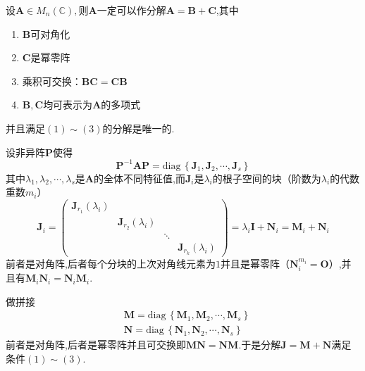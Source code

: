 \begin{formal}
\begin{theorem}\label{thm:Jordan-Chevalley分解定理}
    设$\bm{A}\in M_n\left(\mathbb{C}\right),$则$\bm{A}$一定可以作分解$\bm{A}=\bm{B}+\bm{C}$,其中\begin{enumerate}[label={\textup{(\arabic*)}}]
        \item $\bm{B}$可对角化
        \item $\bm{C}$是幂零阵
        \item 乘积可交换：$\bm{BC}=\bm{CB}$
        \item $\bm{B},\bm{C}$均可表示为$\bm{A}$的多项式
    \end{enumerate}并且满足$(1)\sim (3)$的分解是唯一的.
\end{theorem}
\begin{Proof}
    设非异阵$\bm{P}$使得\[
    \bm{P}^{-1}\bm{A}\bm{P}=\mathrm{diag}\,\left\{
        \bm{J}_1,\bm{J}_2,\cdots,\bm{J}_s
    \right\}
    \]其中$\lambda_1,\lambda_2,\cdots,\lambda_s$是$\bm{A}$的全体不同特征值,而$\bm{J}_i$是$\lambda_i$的根子空间的块（阶数为$\lambda_i$的代数重数$m_i$）\[
    \bm{J}_i=\begin{pmatrix}
        \bm{J}_{r_1}\left(\lambda_i\right)&&&\\
        &\bm{J}_{r_2}\left(\lambda_i\right)&&\\
        &&\ddots&\\
        &&&\bm{J}_{r_k}\left(\lambda_i\right)
    \end{pmatrix}=\lambda_i\bm{I}+\bm{N}_i=\bm{M}_i+\bm{N}_i
    \]前者是对角阵,后者每个分块的上次对角线元素为$1$并且是幂零阵（$\bm{N}_i^{m_i}=\bm{O}$）,并且有$\bm{M}_i\bm{N}_i=\bm{N}_i\bm{M}_i$.

    做拼接\begin{align*}
        &\bm{M}=\mathrm{diag}\,\left\{
            \bm{M}_1,\bm{M}_2,\cdots,\bm{M}_s
        \right\}\\
        &\bm{N}=\mathrm{diag}\,\left\{
            \bm{N}_1,\bm{N}_2,\cdots,\bm{N}_s
        \right\}
    \end{align*}前者是对角阵,后者是幂零阵并且可交换即$\bm{MN}=\bm{NM}$.于是分解$\bm{J}=\bm{M}+\bm{N}$满足条件$(1)\sim (3)$.


\end{Proof}
\end{formal}
